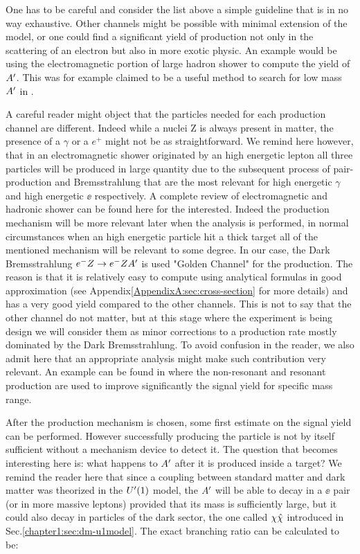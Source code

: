 One has to be careful and consider the list above a simple guideline that is in no way exhaustive. Other channels might be possible with minimal extension of the model, or one could find a significant yield of production not only in the scattering of an electron but also in more exotic physic. An example would be using the electromagnetic portion of large hadron shower to compute the yield of $A'$. This was for example claimed to be a useful method to search for low mass $A'$ in \cite{Celentano:2020vtu}.

A careful reader might object that the particles needed for each production channel are different. Indeed while a nuclei Z is always present in matter, the presence of a $\gamma$ or a $e^+$ might not be as straightforward. We remind here however, that in an electromagnetic shower originated by an high energetic lepton all three particles will be produced in large quantity due to the subsequent process of pair-production and Bremsstrahlung that are the most relevant for high energetic $\gamma$ and high energetic $\ee$ respectively. A complete review of electromagnetic and hadronic shower can be found here \cite{Bichsel:2002cf} for the interested. Indeed the production mechanism will be more relevant later when the analysis is performed, in normal circumstances when an high energetic particle hit a thick target all of the mentioned mechanism will be relevant to some degree. In our case, the Dark Bremsstrahlung $e^- Z \to e^- Z A'$ is used "Golden Channel" for the production. The reason is that it is relatively easy to compute using analytical formulas in good approximation (see Appendix\ref{AppendixA:sec:cross-section} for more details) and has a very good yield compared to the other channels. This is not to say that the other channel do not matter, but at this stage where the experiment is being design we will consider them as minor corrections to a production rate mostly dominated by the Dark Bremsstrahlung. To avoid confusion in the reader, we also admit here that an appropriate analysis might make such contribution very relevant. An example can be found in \cite{Marsicano_2018} where the non-resonant and resonant production are used to improve significantly the signal yield for specific mass range.

After the production mechanism is chosen, some first estimate on the signal yield can be performed. However successfully producing the particle is not by itself sufficient without a mechanism device to detect it. The question that becomes interesting here is: what happens to $A'$ after it is produced inside a target? We remind the reader here that since a coupling between standard matter and dark matter was theorized in the $U'(1)$ model, the $A'$ will be able to decay in a $\ee$ pair (or in more massive leptons) provided that its mass is sufficiently large, but it could also decay in particles of the dark sector, the one called $\chi \hat{\chi}$ introduced in Sec.\ref{chapter1:sec:dm-u1model}. The exact branching ratio can be calculated to be:

